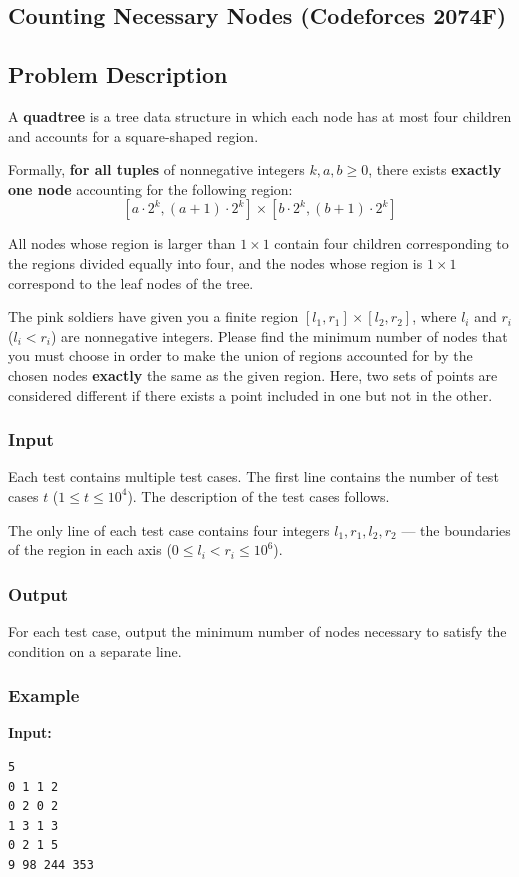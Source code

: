 \subsection {Counting Necessary Nodes (Codeforces 2074F)}
\subsection*{Problem Description}
A \textbf{quadtree} is a tree data structure in which each node has at most four children and accounts for a square-shaped region.

Formally, \textbf{for all tuples} of nonnegative integers $k, a, b \ge 0$, there exists \textbf{exactly one node} accounting for the following region:
$$[a \cdot 2^k, (a + 1) \cdot 2^k] \times [b \cdot 2^k, (b + 1) \cdot 2^k]$$

All nodes whose region is larger than $1 \times 1$ contain four children corresponding to the regions divided equally into four, and the nodes whose region is $1 \times 1$ correspond to the leaf nodes of the tree.

The pink soldiers have given you a finite region $[l_1, r_1] \times [l_2, r_2]$, where $l_i$ and $r_i$ ($l_i < r_i$) are nonnegative integers. Please find the minimum number of nodes that you must choose in order to make the union of regions accounted for by the chosen nodes \textbf{exactly} the same as the given region. Here, two sets of points are considered different if there exists a point included in one but not in the other.

\subsubsection*{Input}
Each test contains multiple test cases. The first line contains the number of test cases $t$ ($1 \le t \le 10^4$). The description of the test cases follows.

The only line of each test case contains four integers $l_1, r_1, l_2, r_2$ --- the boundaries of the region in each axis ($0 \le l_i < r_i \le 10^6$).

\subsubsection*{Output}
For each test case, output the minimum number of nodes necessary to satisfy the condition on a separate line.

\subsubsection*{Example}
\textbf{Input:}
\begin{verbatim}
5
0 1 1 2
0 2 0 2
1 3 1 3
0 2 1 5
9 98 244 353
\end{verbatim}

